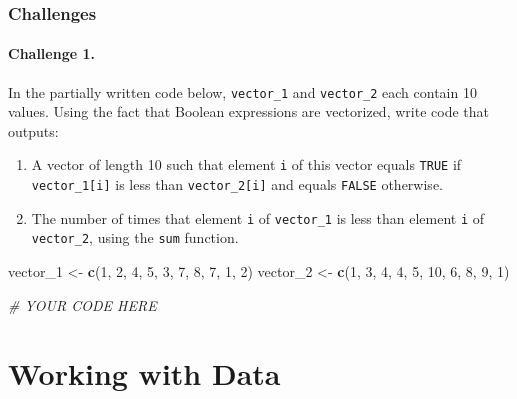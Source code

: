 \documentclass[
]{book}
\newenvironment{Shaded}{\begin{snugshade}}{\end{snugshade}}
\newcommand{\CommentTok}[1]{\textcolor[rgb]{0.56,0.35,0.01}{\textit{#1}}}
\newcommand{\DecValTok}[1]{\textcolor[rgb]{0.00,0.00,0.81}{#1}}
\newcommand{\KeywordTok}[1]{\textcolor[rgb]{0.13,0.29,0.53}{\textbf{#1}}}
\newcommand{\NormalTok}[1]{#1}
\newcommand{\StringTok}[1]{\textcolor[rgb]{0.31,0.60,0.02}{#1}}
\providecommand{\tightlist}{%
  \setlength{\itemsep}{0pt}\setlength{\parskip}{0pt}}
\begin{document}
\hypertarget{challenges-4}{%
\subsection{Challenges}\label{challenges-4}}

\hypertarget{challenge-1.-1}{%
\subsubsection*{Challenge 1.}\label{challenge-1.-1}}

In the partially written code below, \texttt{vector\_1} and \texttt{vector\_2} each contain 10 values. Using the fact that Boolean expressions are vectorized, write code that outputs:

\begin{enumerate}
\def\labelenumi{\arabic{enumi}.}
\tightlist
\item
  A vector of length 10 such that element \texttt{i} of this vector equals \texttt{TRUE} if \texttt{vector\_1{[}i{]}} is less than \texttt{vector\_2{[}i{]}} and equals \texttt{FALSE} otherwise.
\item
  The number of times that element \texttt{i} of \texttt{vector\_1} is less than element \texttt{i} of \texttt{vector\_2}, using the \texttt{sum} function.
\end{enumerate}

\begin{Shaded}
\begin{Highlighting}[]
\NormalTok{vector_}\DecValTok{1}\NormalTok{ <-}\StringTok{ }\KeywordTok{c}\NormalTok{(}\DecValTok{1}\NormalTok{, }\DecValTok{2}\NormalTok{, }\DecValTok{4}\NormalTok{, }\DecValTok{5}\NormalTok{, }\DecValTok{3}\NormalTok{, }\DecValTok{7}\NormalTok{, }\DecValTok{8}\NormalTok{, }\DecValTok{7}\NormalTok{, }\DecValTok{1}\NormalTok{, }\DecValTok{2}\NormalTok{)}
\NormalTok{vector_}\DecValTok{2}\NormalTok{ <-}\StringTok{ }\KeywordTok{c}\NormalTok{(}\DecValTok{1}\NormalTok{, }\DecValTok{3}\NormalTok{, }\DecValTok{4}\NormalTok{, }\DecValTok{4}\NormalTok{, }\DecValTok{5}\NormalTok{, }\DecValTok{10}\NormalTok{, }\DecValTok{6}\NormalTok{, }\DecValTok{8}\NormalTok{, }\DecValTok{9}\NormalTok{, }\DecValTok{1}\NormalTok{)}

\CommentTok{# YOUR CODE HERE}
\end{Highlighting}
\end{Shaded}

\hypertarget{working-with-data}{%
\chapter{Working with Data}\label{working-with-data}}
\end{document}
